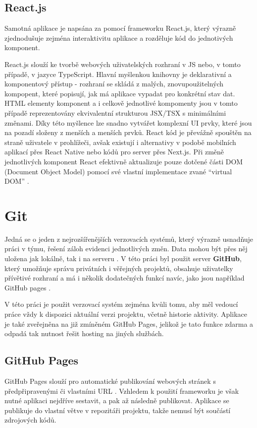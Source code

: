 \subsection{React.js}
Samotná aplikace je napsána za pomocí frameworku React.js, který výrazně zjednodušuje zejména interaktivitu aplikace a rozděluje kód do jednotivých komponent. 

React.js slouží ke tvorbě webových uživatelských rozhraní v JS nebo, v tomto případě, v jazyce TypeScript.
Hlavní myšlenkou knihovny je deklarativní a komponentový přístup - rozhraní se skládá z malých, znovupoužitelných kompopent, 
které popisují, jak má aplikace vypadat pro konkrétní stav dat. 
HTML elementy komponent a i celkově jednotlivé kompomenty jsou v tomto případě reprezentovány ekvivalentní strukturou JSX/TSX s minimálními změnami.
Díky této myšlence lze snadno vytvářet komplexní UI prvky, které jsou na pozadí složeny z menších a menších prvků.
React kód je převážně spouštěn na straně uživatele v prohlížeči, 
avšak existují i alternativy v podobě mobilních aplikací přes React Native nebo kódů pro server přes Next.js.
Při změně jednotlivých komponent React efektivně aktualizuje pouze dotčené části DOM (Document Object Model) 
pomocí své vlastní implementace zvané \enquote{virtual DOM} \cite{mozilla_react}.

\section{Git}
Jedná se o jeden z nejrozšířenějších verzovacích systémů, který výrazně usnadňuje práci v týmu, řešení záloh evidenci jednotlivých změn.
Data mohou být přes něj uložena jak lokálně, tak i na serveru \cite{git}.
V této práci byl použit server \textbf{GitHub}, který umožňuje správu privátních i věřejných projektů, 
obsahuje uživatelky přívětivé rozhraní a má i několik dodatečných funkcí navíc, jako jsou například GitHub pages \cite{github}.

V této práci je použit verzovací systém zejména kvůli tomu, aby měl vedoucí práce vždy k dispozici aktuální verzi projektu, včetně historie aktivity. 
Aplikace je také zveřejněna na již zmíněném GitHub Pages, jelikož je tato funkce zdarma a odpadá tak nutnost řešit hosting na jiných službách.

\subsection{GitHub Pages}
GitHub Pages slouží pro automatické publikování webových stránek s předpřipravenými či vlastními URL \cite{githubpages}. 
Vzhledem k použití frameworku je však nutné aplikaci nejdříve sestavit, a pak až následně publikovat. 
Aplikace se publikuje do vlastní větve v repozitáři projektu, takže nemusí být součástí zdrojových kódů.
